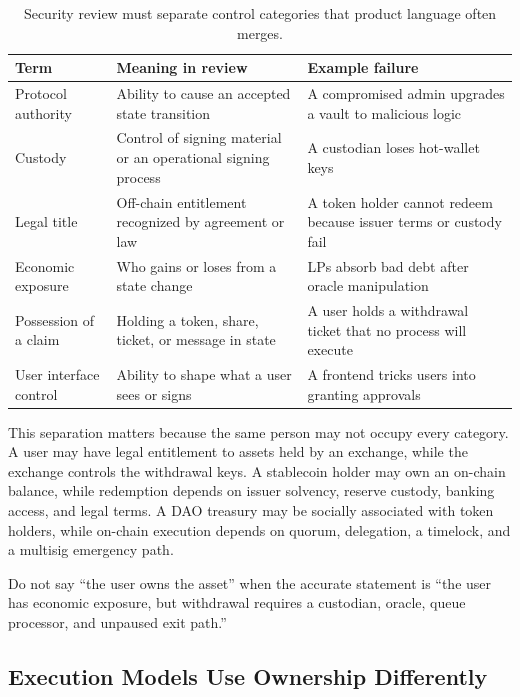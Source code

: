 \begin{table}[htbp]
\centering
\small
\renewcommand{\arraystretch}{1.18}
\begin{tabularx}{\textwidth}{@{}>{\RaggedRight\arraybackslash}p{}>{\RaggedRight\arraybackslash}p{}X@{}}
\toprule
Term & Meaning in review & Example failure \\
\midrule
Protocol authority & Ability to cause an accepted state transition & A compromised admin upgrades a vault to malicious logic \\
Custody & Control of signing material or an operational signing process & A custodian loses hot-wallet keys \\
Legal title & Off-chain entitlement recognized by agreement or law & A token holder cannot redeem because issuer terms or custody fail \\
Economic exposure & Who gains or loses from a state change & LPs absorb bad debt after oracle manipulation \\
Possession of a claim & Holding a token, share, ticket, or message in state & A user holds a withdrawal ticket that no process will execute \\
User interface control & Ability to shape what a user sees or signs & A frontend tricks users into granting approvals \\
\bottomrule
\end{tabularx}
\caption{Security review must separate control categories that product language often merges.}
\end{table}

This separation matters because the same person may not occupy every category. A user may have legal entitlement to assets held by an exchange, while the exchange controls the withdrawal keys. A stablecoin holder may own an on-chain balance, while redemption depends on issuer solvency, reserve custody, banking access, and legal terms. A DAO treasury may be socially associated with token holders, while on-chain execution depends on quorum, delegation, a timelock, and a multisig emergency path.

Do not say ``the user owns the asset'' when the accurate statement is ``the user has economic exposure, but withdrawal requires a custodian, oracle, queue processor, and unpaused exit path.''

\subsection{Execution Models Use Ownership Differently}

